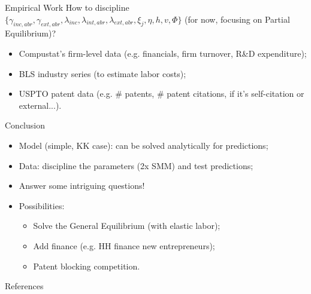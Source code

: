 \documentclass[11pt]{beamer}
\begin{document}
\begin{frame}{Empirical Work}
How to discipline $\{\gamma_{inc,abr}, \gamma_{ext,abr},\lambda_{inc},\lambda_{int, abr},\lambda_{ext, abr}, \xi_j, \eta, h, v, \Phi\}$ (for now, focusing on Partial Equilibrium)?
	\begin{itemize}\itemsep12pt	
		\item Compustat's firm-level data (e.g. financials, firm turnover, R\&D expenditure);
		\item BLS industry series (to estimate labor costs);
		\item USPTO patent data (e.g. \# patents, \# patent citations, if it's self-citation or external...).
	\end{itemize}
\end{frame}

\begin{frame}{Conclusion}
\begin{itemize}\itemsep12pt	
		\item Model (simple, KK case): can be solved analytically for predictions;
		\item Data: discipline the parameters (2x SMM) and test predictions;
		\item Answer some intriguing questions!
		\item Possibilities: 
		\begin{itemize}\itemsep12pt
			\item Solve the General Equilibrium (with elastic labor);
			\item Add finance (e.g. HH finance new entrepreneurs);
			\item Patent blocking competition.
		\end{itemize}
	\end{itemize}
\end{frame}

\begin{frame}{References}
	\nocite{*}
	
\end{frame}
\end{document}
